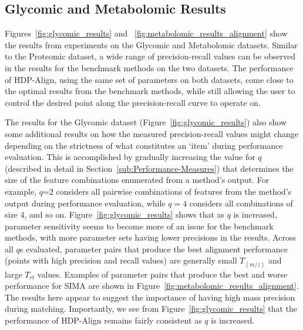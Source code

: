 \subsection{Glycomic and Metabolomic Results}
\label{sub:glycomic-metabolomic-results}

Figures~\ref{fig:glycomic_results} and ~\ref{fig:metabolomic_results_alignment} show the results from experiments on the Glycomic and Metabolomic datasets. Similar to the Proteomic dataset, a wide range of precision-recall values can be observed in the results for the benchmark methods on the two datasets. The performance of HDP-Align, using the same set of parameters on both datasets, come close to the optimal results from the benchmark methods, while still allowing the user to control the desired point along the precision-recall curve to operate on.

The results for the Glycomic dataset (Figure~\ref{fig:glycomic_results}) also show some additional results on how the measured precision-recall values might change depending on the strictness of what constitutes an `item' during performance evaluation. This is accomplished by gradually increasing the value for $q$ (described in detail in Section~\ref{sub:Performance-Measures}) that determines the size of the feature combinations enumerated from a method's output. For example, $q$=2 considers all pairwise combinations of features from the method's output during performance evaluation, while $q=4$ considers all combinations of size 4, and so on. Figure~\ref{fig:glycomic_results} shows that as $q$ is increased, parameter sensitivity seems to become more of an issue for the benchmark methods, with more parameter sets having lower precisions in the results. Across all $q$s evaluated, parameter pairs that produce the best alignment performance (points with high precision and recall values) are generally small $T_{(m/z)}$ and large $T_{rt}$ values. Examples of parameter pairs that produce the best and worse performance for SIMA are shown in Figure~\ref{fig:metabolomic_results_alignment}. The results here appear to suggest the importance of having high mass precision during matching. Importantly, we see from Figure~\ref{fig:glycomic_results} that the performance of HDP-Align remains fairly consistent as $q$ is increased.

